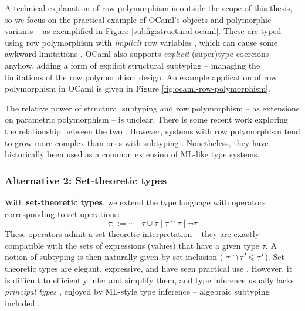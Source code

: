 A technical explanation of row polymorphism is outside the scope of this thesis, so we focus on the practical example of OCaml's objects \cite{objective-ml} and polymorphic variants \cite{polymorphic-variants} -- as exemplified in Figure \ref{subfig:structural-ocaml}. These are typed using row polymorphism with \emph{implicit} row variables \cite{objective-ml}, which can cause some awkward limitations \cite{castagna-polymorphic-variants}. OCaml also supports \emph{explicit} (super)type coercions anyhow, adding a form of explicit structural subtyping -- managing the limitations of the row polymorphism design. 
An example application of row polymorphism in OCaml is given in Figure \ref{fig:ocaml-row-polymorphism}.

The relative power of structural subtyping and row polymorphism -- as extensions on parametric polymorphism -- is unclear.
There is some recent work exploring the relationship between the two \cite{disjoint-polymorphism, structural-subtyping-as-parameric-polymorphism}. However, systems with row polymorphism tend to grow more complex than ones with subtyping \cite{castagna-polymorphic-variants}. Nonetheless, they have historically been used as a common extension of ML-like type systems.

\subsubsection{Alternative 2: Set-theoretic types}

With \textbf{set-theoretic types}, we extend the type language with operators corresponding to set operations:
$$ \tau ::= \cdots \mid \tau \cup \tau \mid \tau \cap \tau \mid \lnot \tau $$
These operators admit a set-theoretic interpretation -- they are exactly compatible with the sets of expressions (values) that have a given type $\tau$. 
A notion of subtyping is then naturally given by set-inclusion (\eg{} $\tau \cap \tau' \leqslant \tau'$).
Set-theoretic types are elegant, expressive, and have seen practical use \cite{set-theoretic-types-for-elixir, set-theoretic-types-for-erlang}. However, it is difficult to efficiently infer and simplify them, and type inference usually lacks \emph{principal types} \cite{polymorphic-set-theoretic-types, castagna-polymorphic-variants, castagna-dynamic}, enjoyed by ML-style type inference -- algebraic subtyping included \cite{mlstruct, castagna-dynamic}. 

